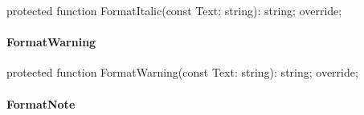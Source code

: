 \documentclass{report}
\newif\ifpdf
\begin{document}
\label{PasDoc_GenHtml.TGenericHTMLDocGenerator-FormatItalic}
\begin{list}{}{
\setlength{\itemindent}{0cm}
\setlength{\listparindent}{0cm}
\setlength{\leftmargin}{\evensidemargin}
\addtolength{\leftmargin}{\tmplength}
\settowidth{\labelsep}{X}
\addtolength{\leftmargin}{\labelsep}
\setlength{\labelwidth}{\tmplength}
}
\item[\textbf{Declaration}\hfill]
\ifpdf
\begin{flushleft}
\fi
\begin{ttfamily}
protected function FormatItalic(const Text: string): string; override;\end{ttfamily}

\ifpdf
\end{flushleft}
\fi

\end{list}
\paragraph*{FormatWarning}\hspace*{\fill}

\label{PasDoc_GenHtml.TGenericHTMLDocGenerator-FormatWarning}
\begin{list}{}{
\setlength{\itemindent}{0cm}
\setlength{\listparindent}{0cm}
\setlength{\leftmargin}{\evensidemargin}
\addtolength{\leftmargin}{\tmplength}
\settowidth{\labelsep}{X}
\addtolength{\leftmargin}{\labelsep}
\setlength{\labelwidth}{\tmplength}
}
\item[\textbf{Declaration}\hfill]
\ifpdf
\begin{flushleft}
\fi
\begin{ttfamily}
protected function FormatWarning(const Text: string): string; override;\end{ttfamily}

\ifpdf
\end{flushleft}
\fi

\end{list}
\paragraph*{FormatNote}\hspace*{\fill}
\end{document}
